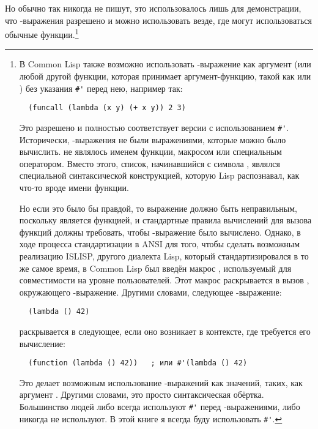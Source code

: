 Но обычно так никогда не пишут, это использовалось лишь для демонстрации, что
-выражения разрешено и можно использовать везде, где могут использоваться
обычные функции.\footnote{В Common Lisp также возможно использовать
-выражение как аргумент  (или любой другой функции, которая
принимает аргумент-функцию, такой как  или ) без указания
\lstinline!#'! перед нею, например так:

\begin{lstlisting}
  (funcall (lambda (x y) (+ x y)) 2 3)
\end{lstlisting}

Это разрешено и полностью соответствует версии с использованием \lstinline!#'!.  Исторически,
-выражения не были выражениями, которые можно было вычислить.  
не являлось именем функции, макросом или специальным оператором.  Вместо этого, список,
начинавшийся с символа , являлся специальной синтаксической конструкцией,
которую Lisp распознавал, как что-то вроде имени функции.

Но если это было бы правдой, то выражение  должно быть
неправильным, поскольку  является функцией, и стандартные правила вычислений
для вызова функций должны требовать, чтобы -выражение было вычислено.
Однако, в ходе процесса стандартизации в ANSI для того, чтобы сделать возможным реализацию
ISLISP, другого диалекта Lisp, который стандартизировался в то же самое время, в Common
Lisp был введён макрос , используемый для совместимости на уровне
пользователей.  Этот макрос раскрывается в вызов , окружающего
-выражение.  Другими словами, следующее -выражение:

\begin{lstlisting}
  (lambda () 42)
\end{lstlisting}

раскрывается в следующее, если оно возникает в контексте, где требуется его вычисление:

\begin{lstlisting}
  (function (lambda () 42))   ; или #'(lambda () 42)
\end{lstlisting}

Это делает возможным использование -выражений как значений, таких, как
аргумент .  Другими словами, это просто синтаксическая обёртка.  Большинство
людей либо всегда используют \lstinline!#'! перед -выражениями, либо никогда
не используют.  В этой книге я всегда буду использовать \lstinline!#'!.}

